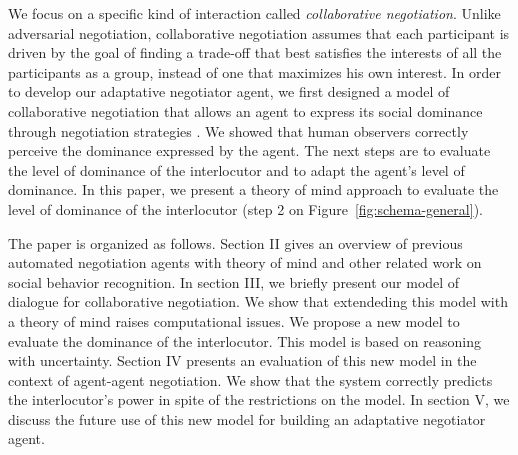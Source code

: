 \documentclass[conference, letterpaper]{IEEEtran}
\begin{document}
We focus on a specific kind of interaction called \emph{collaborative negotiation}. Unlike adversarial negotiation, collaborative negotiation assumes that each participant is driven by the goal of finding a trade-off that best satisfies the interests of all the participants as a group, instead of one that maximizes his own interest\cite{sidnerartificial,chu1995response}. In order to develop our adaptative negotiator agent, we first designed a model of collaborative negotiation that allows an agent to express its social dominance through negotiation strategies \cite{ouali2017computational}. We showed that human observers correctly perceive the dominance expressed by the agent. The next steps are to evaluate the level of dominance of the interlocutor and to adapt the agent's level of dominance. In this paper, we present a theory of mind approach to evaluate the level of dominance of the interlocutor (step 2 on Figure~\ref{fig:schema-general}).

%	
%	
%	
%	
%	
%	
%	
The paper is organized as follows. Section II gives an overview of previous automated negotiation agents with theory of mind and other related work on social behavior recognition. In section III, we briefly present our model of dialogue for collaborative negotiation. We show that extendeding this model with a theory of mind raises computational issues. We propose a new model to evaluate the dominance of the interlocutor. This model is based on reasoning with uncertainty. Section IV presents an evaluation of this new model in the context of agent-agent negotiation. We show that the system correctly predicts the interlocutor's power in spite of the restrictions on the model. In section V, we discuss the future use of this new model for building an adaptative negotiator agent.
\end{document}
